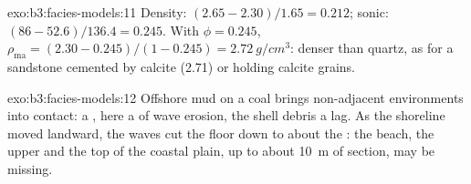 \begin{solution}{exo:b3:facies-models:11}
Density: $(2.65 - 2.30)/1.65 = 0.212$; sonic: $(86 - 52.6)/136.4 = 0.245$.
With $\phi = 0.245$, $\rho_{\mathrm{ma}} = (2.30 - 0.245)/(1 - 0.245) =
\qty{2.72}{g/cm^3}$: denser than quartz, as for a sandstone cemented by
calcite (2.71) or holding calcite grains.
\end{solution}

\begin{solution}{exo:b3:facies-models:12}
Offshore mud on a coal brings non-adjacent environments into contact: a
, here a  of wave erosion, the shell
debris a lag. As the shoreline moved landward, the waves cut the floor down
to about the : the beach, the upper  and the
top of the coastal plain, up to about \qty{10}{m} of section, may be
missing.
\end{solution}

